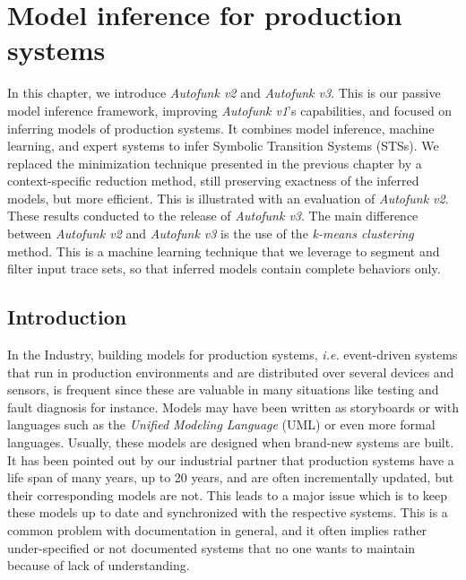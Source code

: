 \chapter{Model inference for production systems}
\label{sec:modelinf:prodsystems}

In this chapter, we introduce \emph{Autofunk v2} and
\emph{Autofunk v3}. This is our passive model inference
framework, improving \emph{Autofunk v1}'s capabilities, and
focused on inferring models of production systems. It combines
model inference, machine learning, and expert systems to infer
Symbolic Transition Systems (STSs). We replaced the minimization
technique presented in the previous chapter by a context-specific
reduction method, still preserving exactness of the inferred
models, but more efficient. This is illustrated with an
evaluation of \emph{Autofunk v2}. These results conducted to
the release of \emph{Autofunk v3}.  The main difference between
\emph{Autofunk v2} and \emph{Autofunk v3} is the use of the
\emph{k-means clustering} method. This is a machine learning
technique that we leverage to segment and filter input trace
sets, so that inferred models contain complete behaviors only.\\

\minitoc

\pagebreak

\section{Introduction}

In the Industry, building models for production systems,
\emph{i.e.} event-driven systems that run in production
environments and are distributed over several devices and
sensors, is frequent since these are valuable in many situations
like testing and fault diagnosis for instance. Models may have
been written as storyboards or with languages such as the \emph{Unified
Modeling Language} (UML) or even more formal languages. Usually,
these models are designed when brand-new systems are built. It
has been pointed out by our industrial partner that production
systems have a life span of many years, up to 20 years, and are
often incrementally updated, but their corresponding models are
not.  This leads to a major issue which is to keep these models
up to date and synchronized with the respective systems. This is
a common problem with documentation in general, and it often
implies rather under-specified or not documented systems that no
one wants to maintain because of lack of understanding.

